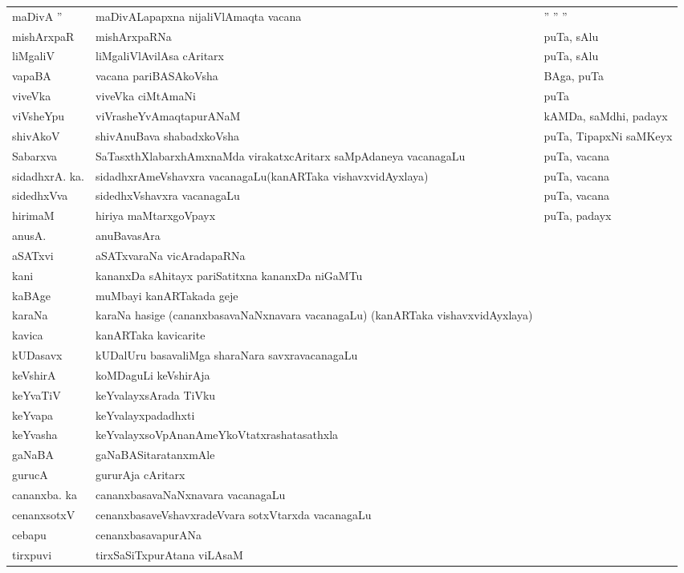 {\begin{longtable}{l>{\raggedright}p{7cm}l}
maDivA '' & maDivALapapxna nijaliVlAmaqta vacana & \qquad '' '' ''\\
mishArxpaR & mishArxpaRNa & puTa, sAlu\\
liMgaliV & liMgaliVlAvilAsa cAritarx & puTa, sAlu\\
vapaBA & vacana pariBASAkoVsha & BAga, puTa\\
viveVka & viveVka ciMtAmaNi & puTa\\
viVsheYpu & viVrasheYvAmaqtapurANaM & kAMDa, saMdhi, padayx\\
shivAkoV & shivAnuBava shabadxkoVsha & puTa, TipapxNi saMKeyx\\
Sabarxva & SaTasxthXlabarxhAmxnaMda virakatxcAritarx saMpAdaneya vacanagaLu & puTa, vacana\\
sidadhxrA. ka. & sidadhxrAmeVshavxra vacanagaLu\newline (kanARTaka vishavxvidAyxlaya) & puTa, vacana\\
sidedhxVva & sidedhxVshavxra vacanagaLu & puTa, vacana\\
hirimaM & hiriya maMtarxgoVpayx & puTa, padayx\\
anusA. & anuBavasAra & \\
aSATxvi & aSATxvaraNa vicAradapaRNa & \\
kani & kananxDa sAhitayx pariSatitxna kananxDa niGaMTu & \\
kaBAge & muMbayi kanARTakada geje &\\
karaNa  & karaNa hasige (cananxbasavaNaNxnavara vacanagaLu) (kanARTaka vishavxvidAyxlaya) &\\
kavica & kanARTaka kavicarite & \\
kUDasavx & kUDalUru basavaliMga sharaNara savxravacanagaLu & \\
keVshirA & koMDaguLi keVshirAja & \\
keYvaTiV & keYvalayxsArada TiVku & \\
keYvapa & keYvalayxpadadhxti & \\
keYvasha & keYvalayxsoVpAnanAmeYkoVtatxrashatasathxla & \\
gaNaBA & gaNaBASitaratanxmAle & \\
gurucA & gururAja cAritarx & \\
cananxba. ka & cananxbasavaNaNxnavara vacanagaLu & \\
cenanxsotxV & cenanxbasaveVshavxradeVvara sotxVtarxda vacanagaLu & \\
cebapu & cenanxbasavapurANa & \\
tirxpuvi & tirxSaSiTxpurAtana viLAsaM & \\

\end{longtable}}
